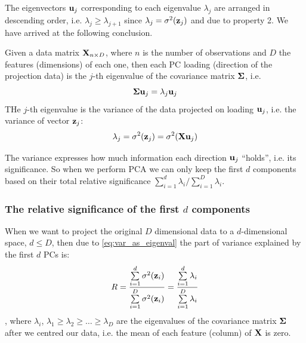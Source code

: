 \documentclass[a4paper]{article}
\begin{document}
The eigenvectors $\textbf{u}_j$ corresponding to each eigenvalue $\lambda_j$ are arranged in descending order, i.e. $\lambda_j \geq \lambda_{j+1}$ since $\lambda_j = \sigma^2(\textbf{z}_j)$ and due to property 2. We have arrived at the following conclusion.
\begin{lemma}
Given a data matrix $\textbf{X}_{n\times D}$, where $n$ is the number of observations and $D$ the features (dimensions) of each one, then each PC loading (direction of the projection data) is the $j$-th eigenvalue of the covariance matrix $\boldsymbol{\Sigma}$, i.e.
\begin{equation}
    \boldsymbol{\Sigma}\textbf{u}_j = \lambda_j\textbf{u}_j
\end{equation}
THe $j$-th eigenvalue is the variance of the data projected on loading $\textbf{u}_j$, i.e. the variance of vector $\textbf{z}_j$:
\begin{equation}
    \lambda_j = \sigma^2(\textbf{z}_j) = \sigma^2(\textbf{X}\textbf{u}_j)
    \label{eq:var_as_eigenval}
\end{equation}
\end{lemma}
The variance expresses how much information each direction $\textbf{u}_j$ ``holds'', i.e. its significance. So when we perform PCA we can only keep the first $d$ components based on their total relative significance $\sum_{i=1}^d\lambda_i/\sum_{i=1}^D\lambda_i$.


\subsubsection{The relative significance of the first $d$ components}
\label{sec:significance_first_k_comps}
When we want to project the original $D$ dimensional data to a  $d$-dimensional space, $d\leq D$, then due to \eqref{eq:var_as_eigenval} the part of variance explained by the first $d$ PCs is:
\begin{equation}
    R = \frac{\sum\limits_{i=1}^d \sigma^2(\textbf{z}_i)}{\sum\limits_{i=1}^D \sigma^2(\textbf{z}_i)} = \frac{\sum\limits_{i=1}^d\lambda_i}{\sum\limits_{i=1}^D \lambda_i}
\end{equation}
, where $\lambda_i$, $\lambda_1 \geq \lambda_2 \geq \ldots \geq \lambda_D$ are the eigenvalues of the covariance matrix $\boldsymbol{\Sigma}$  after we centred our data, i.e. the mean of each feature (column) of $\textbf{X}$ is zero. 
\end{document}
